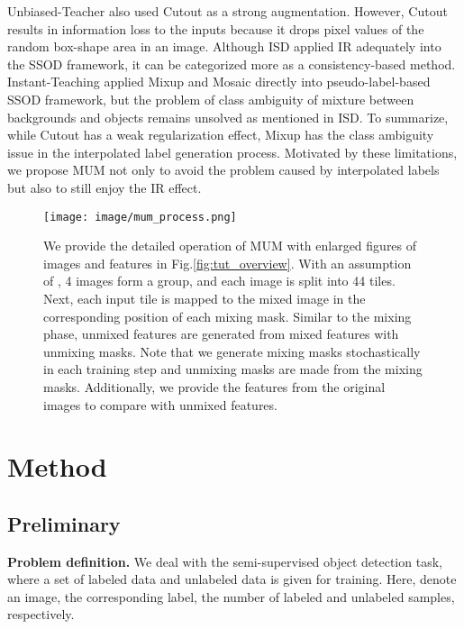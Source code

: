 \documentclass[10pt,twocolumn,letterpaper]{article}
\begin{document}
Unbiased-Teacher\cite{liu2021unbiased} also used Cutout\cite{devries2017cutout} as a strong augmentation.
However, Cutout results in information loss to the inputs because it drops pixel values of the random box-shape area in an image.
Although ISD\cite{Jeong_2021_CVPR} applied IR adequately into the SSOD framework, it can be categorized more as a consistency-based method.
Instant-Teaching\cite{zhou2021instant} applied Mixup\cite{zhang2017mixup} and Mosaic\cite{ge2021yolox} directly into pseudo-label-based SSOD framework, but the problem of class ambiguity of mixture between backgrounds and objects remains unsolved as mentioned in ISD\cite{Jeong_2021_CVPR}.
To summarize, while Cutout\cite{devries2017cutout} has a weak regularization effect,
Mixup\cite{zhang2017mixup} has the class ambiguity issue in the interpolated label generation process.
Motivated by these limitations, we propose MUM not only to avoid the problem caused by interpolated labels but also to still enjoy the IR effect. 

\begin{figure*}[ht] \texttt{[image: image/mum\_process.png]}
\caption{We provide the detailed operation of MUM with enlarged figures of images and features in Fig.\ref{fig:tut_overview}.
With an assumption of , 4 images form a group, and each image is split into 44 tiles.
Next, each input tile is mapped to the mixed image in the corresponding position of each mixing mask.
Similar to the mixing phase, unmixed features are generated from mixed features with unmixing masks.
Note that we generate mixing masks stochastically in each training step and unmixing masks are made from the mixing masks.
Additionally, we provide the features from the original images to compare with unmixed features.
}
\label{fig:tile_untile_feat}
\end{figure*} 

\section{Method}
\label{sec:method}

\subsection{Preliminary}
\label{subsec:problem}
\noindent \textbf{Problem definition.} We deal with the semi-supervised object detection task, where a set of labeled data  and unlabeled data  is given for training. 
Here,  denote an image, the corresponding label, the number of labeled and unlabeled samples, respectively.
\end{document}
